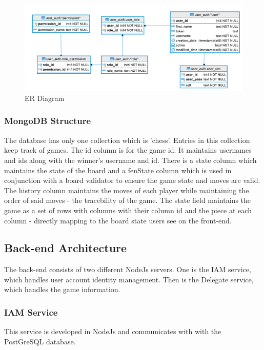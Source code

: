 \documentclass[12pt]{article}
\begin{document}
\begin{figure}[h!]
    \includegraphics[width=\linewidth]{postgres.png}
    \caption{ER Diagram}
\end{figure}

\subsubsection{MongoDB Structure}
The database has only one collection which is 'chess'. Entries in this collection keep track of games. The id column is for the game id. It maintains usernames and ids along with the winner's username and id. There is a state column which maintains the state of the board and a fenState column which is used in conjunction with a board validator to ensure the game state and moves are valid. The history column maintains the moves of each player while maintaining the order of said moves - the tracebility of the game. 
The state field maintains the game as a set of rows with columns with their column id and the piece at each column - directly mapping to the board state users see on the front-end.

\subsection{Back-end Architecture}
The back-end consists of two different NodeJs servers. One is the IAM service, which handles user account identity management. Then is the Delegate service, which handles the game information.

\subsubsection{IAM Service}
This service is developed in NodeJs and communicates with with the PostGreSQL database.
\end{document}
